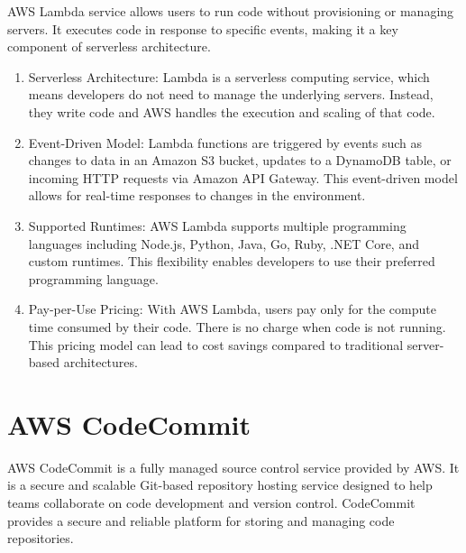 \documentclass[11pt,a4paper,oneside]{report}
\begin{document}
AWS Lambda \cite{awslambda} service allows users to run code without provisioning or managing servers. It executes code in response to specific events, making it a key component of serverless architecture.
\begin{enumerate}
  \item Serverless Architecture: Lambda is a serverless computing service, which means developers do not need to manage the underlying servers. Instead, they write code and AWS handles the execution and scaling of that code.
  \item Event-Driven Model: Lambda functions are triggered by events such as changes to data in an Amazon S3 bucket, updates to a DynamoDB table, or incoming HTTP requests via Amazon API Gateway. This event-driven model allows for real-time responses to changes in the environment.
  \item Supported Runtimes: AWS Lambda supports multiple programming languages including Node.js, Python, Java, Go, Ruby, .NET Core, and custom runtimes.
        This flexibility enables developers to use their preferred programming language.
  \item Pay-per-Use Pricing: With AWS Lambda, users pay only for the compute time consumed by their code. There is no charge when code is not running. This pricing model can lead to cost savings compared to traditional server-based architectures.
\end{enumerate}


\section{AWS CodeCommit}
AWS CodeCommit \cite{awscodecommit} is a fully managed source control service provided by AWS. It is a secure and scalable Git-based repository hosting service designed to help teams collaborate on code development and version control. CodeCommit provides a secure and reliable platform for storing and managing code repositories.
\end{document}
